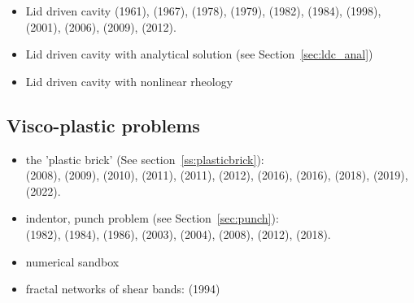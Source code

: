 \begin{itemize}
\item Lid driven cavity 
      \textcite{kawa61} (1961),
      \textcite{chor67} (1967),
      \textcite{shry78} (1978),
      \textcite{foth79} (1979),
      \textcite{ghgs82} (1982),
      \textcite{kost84} (1984),
      \textcite{bope98} (1998),
      \textcite{xika01} (2001),
      \textcite{brsa06} (2006),
      \textcite{ertu09} (2009),
      \textcite{tesk12} (2012).

\item Lid driven cavity with analytical solution (see Section~\ref{sec:ldc_anal})

\item Lid driven cavity with nonlinear rheology \cite{been80,svna18}
\end{itemize}

\subsection{Visco-plastic problems}

\begin{itemize}

\item the 'plastic brick' (See section~\ref{ss:plasticbrick}): \\
      \textcite{lemm08} (2008), 
      \textcite{qurj09} (2009), 
      \textcite{kaus10} (2010), 
      \textcite{mishin11} (2011), 
      \textcite{muso11} (2011), 
      \textcite{maie12} (2012), 
      \textcite{spmw16} (2016), 
      \textcite{kapb16} (2016), 
      \textcite{gltf18} (2018), 
      \textcite{frbt19} (2019),
      \textcite{mivg22} (2022).

\item indentor, punch problem (see Section~\ref{sec:punch}):\\
      \textcite{vidm82} (1982),
      \textcite{vidm84} (1984),
      \textcite{vimd86} (1986),
      \textcite{hukm03} (2003), 
      \textcite{fojd04} (2004), 
      \textcite{thfb08} (2008),
      \textcite{gerb12} (2012), 
      \textcite{gltf18} (2018).

\item numerical sandbox \cite{bube06,bube06,maie12,busa16,gltf18}

\item fractal networks of shear bands: \textcite{pohe94} (1994)

\end{itemize}


